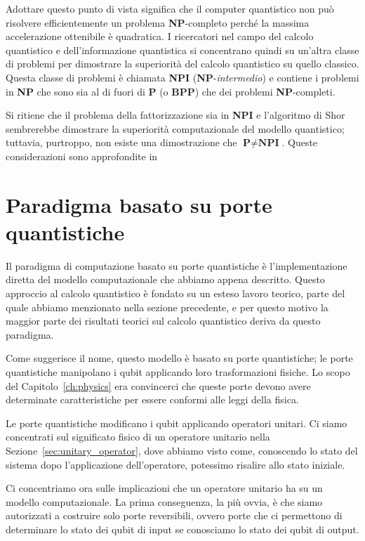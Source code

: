 Adottare questo punto di vista significa che il computer quantistico non può risolvere efficientemente un problema \textbf{NP}-completo perché la massima accelerazione ottenibile è quadratica. I ricercatori nel campo del calcolo quantistico e dell'informazione quantistica si concentrano quindi su un'altra classe di problemi per dimostrare la superiorità del calcolo quantistico su quello classico. Questa classe di problemi è chiamata \textbf{NPI} (\textbf{NP}-\emph{intermedio}) e contiene i problemi in \textbf{NP} che sono sia al di fuori di \textbf{P} (o \textbf{BPP}) che dei problemi \textbf{NP}-completi. 

Si ritiene che il problema della fattorizzazione sia in \textbf{NPI} e l'algoritmo di Shor sembrerebbe dimostrare la superiorità computazionale del modello quantistico; tuttavia, purtroppo, non esiste una dimostrazione che $\textbf{P} \neq \textbf{NPI}$. Queste considerazioni sono approfondite in \cite[pagine 150, 151, 270 e 271]{nielsen2010quantum}

\section{Paradigma basato su porte quantistiche}
\label{sec:gate_model}
Il paradigma di computazione basato su porte quantistiche è l'implementazione diretta del modello computazionale che abbiamo appena descritto. Questo approccio al calcolo quantistico è fondato su un esteso lavoro teorico, parte del quale abbiamo menzionato nella sezione precedente, e per questo motivo la maggior parte dei risultati teorici sul calcolo quantistico deriva da questo paradigma.

Come suggerisce il nome, questo modello è basato su porte quantistiche; le porte quantistiche manipolano i qubit applicando loro trasformazioni fisiche. Lo scopo del Capitolo~\ref{ch:physics} era convincerci che queste porte devono avere determinate caratteristiche per essere conformi alle leggi della fisica.

Le porte quantistiche modificano i qubit applicando operatori unitari. Ci siamo concentrati sul significato fisico di un operatore unitario nella Sezione~\ref{sec:unitary_operator}, dove abbiamo visto come, conoscendo lo stato del sistema dopo l'applicazione dell'operatore, potessimo risalire allo stato iniziale.

Ci concentriamo ora sulle implicazioni che un operatore unitario ha su un modello computazionale. La prima conseguenza, la più ovvia, è che siamo autorizzati a costruire solo porte reversibili, ovvero porte che ci permettono di determinare lo stato dei qubit di input se conosciamo lo stato dei qubit di output.

